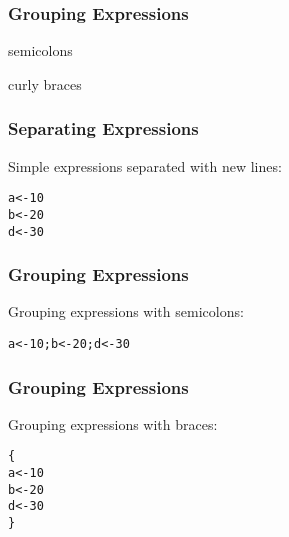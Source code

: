 \documentclass[12pt]{beamer}\usepackage[]{graphicx}\usepackage[]{color}
\makeatletter
\newcommand{\hlnum}[1]{\textcolor[rgb]{0.686,0.059,0.569}{#1}}%
\newcommand{\hlstd}[1]{\textcolor[rgb]{0.345,0.345,0.345}{#1}}%
\newcommand{\hlkwb}[1]{\textcolor[rgb]{0.69,0.353,0.396}{#1}}%
\newenvironment{kframe}{%
 \def\at@end@of@kframe{}%
 \ifinner\ifhmode%
  \def\at@end@of@kframe{\end{minipage}}%
  \begin{minipage}{\columnwidth}%
 \fi\fi%
 \def\FrameCommand##1{\hskip\@totalleftmargin \hskip-\fboxsep
 \colorbox{shadecolor}{##1}\hskip-\fboxsep
     \hskip-\linewidth \hskip-\@totalleftmargin \hskip\columnwidth}%
 \MakeFramed {\advance\hsize-\width
   \@totalleftmargin\z@ \linewidth\hsize
   \@setminipage}}%
 {\par\unskip\endMakeFramed%
 \at@end@of@kframe}
\newenvironment{knitrout}{}{} %
\makeatother
\begin{document}

\begin{frame}[fragile]
\frametitle{Grouping Expressions}

\bbi
  \item semicolons
  \item curly braces
\ei
\eb

\end{frame}


\begin{frame}[fragile]
\frametitle{Separating Expressions}

Simple expressions separated with new lines:
\begin{knitrout}\footnotesize
{}\color{fgcolor}\begin{kframe}
\begin{alltt}
\hlstd{a} \hlkwb{<-} \hlnum{10}
\hlstd{b} \hlkwb{<-} \hlnum{20}
\hlstd{d} \hlkwb{<-} \hlnum{30}
\end{alltt}
\end{kframe}
\end{knitrout}

\end{frame}


\begin{frame}[fragile]
\frametitle{Grouping Expressions}

Grouping expressions with semicolons:
\begin{knitrout}\footnotesize
{}\color{fgcolor}\begin{kframe}
\begin{alltt}
\hlstd{a} \hlkwb{<-} \hlnum{10}\hlstd{; b} \hlkwb{<-} \hlnum{20}\hlstd{; d} \hlkwb{<-} \hlnum{30}
\end{alltt}
\end{kframe}
\end{knitrout}

\end{frame}


\begin{frame}[fragile]
\frametitle{Grouping Expressions}

Grouping expressions with braces:
\begin{knitrout}\footnotesize
{}\color{fgcolor}\begin{kframe}
\begin{alltt}
\hlstd{\{}
  \hlstd{a} \hlkwb{<-} \hlnum{10}
  \hlstd{b} \hlkwb{<-} \hlnum{20}
  \hlstd{d} \hlkwb{<-} \hlnum{30}
\hlstd{\}}
\end{alltt}
\end{kframe}
\end{knitrout}

\end{frame}
\end{document}
